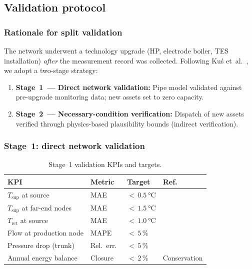 \documentclass[review,3p]{elsarticle}
\begin{document}
\subsection{Validation protocol}
\label{sec:case_validation}

\subsubsection{Rationale for split validation}

The network underwent a technology upgrade (HP, electrode boiler, TES
installation) \emph{after} the measurement record was collected.
Following Ku\'{s} et~al.~\cite{Kus2025}, we adopt a two-stage
strategy:
%
\begin{enumerate}[nosep]
  \item \textbf{Stage~1~--- Direct network validation:} Pipe model
        validated against pre-upgrade monitoring data; new assets set
        to zero capacity.
  \item \textbf{Stage~2~--- Necessary-condition verification:}
        Dispatch of new assets verified through physics-based
        plausibility bounds (indirect verification).
\end{enumerate}

\subsubsection{Stage~1: direct network validation}
\label{sec:val_stage1}

\begin{table}[htbp]
\centering
\caption{Stage~1 validation KPIs and targets.}
\label{tab:val_targets}
\small
\begin{tabular}{@{} l l l l @{}}
\toprule
KPI & Metric & Target & Ref.\ \\
\midrule
$T_{\mathrm{sup}}$ at source
  & MAE & ${<}\,\SI{0.5}{\celsius}$ & \cite{Maldonado2024} \\
$T_{\mathrm{sup}}$ at far-end nodes
  & MAE & ${<}\,\SI{1.5}{\celsius}$ & \cite{Kus2025} \\
$T_{\mathrm{ret}}$ at source
  & MAE & ${<}\,\SI{1.0}{\celsius}$ & \cite{Kus2025} \\
Flow at production node
  & MAPE & ${<}\,5\,\%$ & \cite{Maldonado2024} \\
Pressure drop (trunk)
  & Rel.\ err.\ & ${<}\,5\,\%$ & \cite{Kus2025} \\
Annual energy balance
  & Closure & ${<}\,2\,\%$ & Conservation \\
\bottomrule
\end{tabular}
\end{table}
\end{document}
